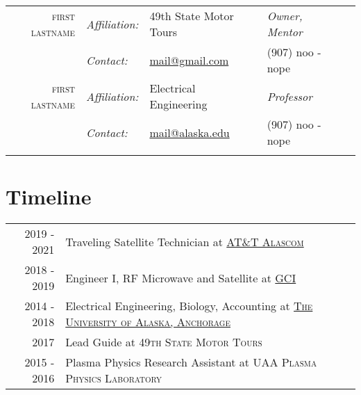 \documentclass[letter,11pt]{article}
\begin{document}
\begin{center}
{\begin{tabular}{r|llp{5cm}l}
\addlinespace[8pt]

		\textsc{first lastname}
	&	\emph{Affiliation:}
	&	49th State Motor Tours
	&	\emph{Owner, Mentor}
	\\
		\rule{0pt}{12pt}
	&	\emph{Contact:}
	&	\href{mailto:mail@gmail.com}{mail@gmail.com}
	&	(907) noo - nope
	\\

\addlinespace[8pt]

		\textsc{first lastname}
	&	\emph{Affiliation:}
	&	Electrical Engineering
	&	\emph{Professor}
	\\
		\rule{0pt}{12pt}
	&	\emph{Contact:}
	&	\href{mailto:mail@alaska.edu}{mail@alaska.edu}
	&	(907) noo - nope
	\\

\addlinespace[10pt]
\end{tabular}

\section{Timeline}

\hspace{-12pt}
\begin{tabular}{r|l}
\addlinespace[8pt]

		\textsc{2019 - 2021}
	&	Traveling Satellite Technician at 
		\href{https://en.wikipedia.org/wiki/AT&T_Alascom}
		{\textsc{AT\&T Alascom}}
	\\

\addlinespace[8pt]

		\textsc{2018 - 2019}
	&	Engineer I, RF Microwave and Satellite at 
		\href{https://www.gci.com}
		{\textsc{GCI}}
	\\

\addlinespace[8pt]

		\textsc{2014 - 2018}
	&	Electrical Engineering, Biology, Accounting at 
		\href{https://www.uaa.alaska.edu}
		{\textsc{The University of Alaska, Anchorage}}
	\\

\addlinespace[8pt]

		\textsc{2017}
	&	Lead Guide at \textsc{49th State Motor Tours}
	\\

\addlinespace[8pt]

		\textsc{2015 - 2016}
	&	Plasma Physics Research Assistant at \textsc{UAA Plasma Physics Laboratory}
	\\


\end{tabular}}
\end{center}
\end{document}
